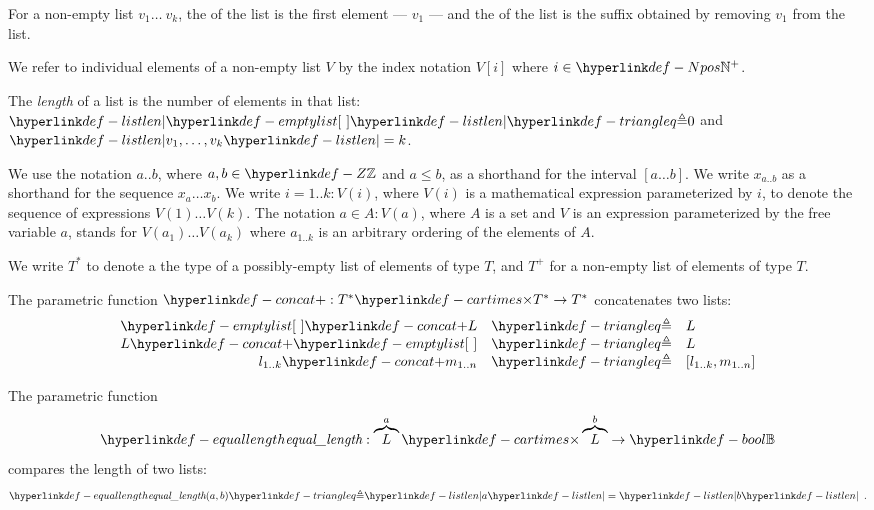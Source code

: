 \hypertarget{def-head}{}
\hypertarget{def-tail}{}
For a non-empty list $v_1 \ldots\ v_k$, the \emph{\head} of the list is the first element --- $v_1$ ---
and the \emph{\tail} of the list is the suffix obtained by removing $v_1$ from the list.

We refer to individual elements of a non-empty list $V$ by the index notation $V[i]$ where $i\in\Npos$.

\hypertarget{def-listlen}{}
\begin{definition}
The \emph{length} of a list is the number of elements in that list:
$\listlen{\emptylist} \triangleq 0$ and $\listlen{v_1,\ldots,v_k}=k$.
\end{definition}

We use the notation $a..b$, where $a,b\in\Z$ and $a\leq b$, as a shorthand for the interval $[a\ldots b]$.
We write $x_{a..b}$ as a shorthand for the sequence $x_a \ldots x_b$.
%
We write $i=1..k: V(i)$, where $V(i)$ is a mathematical expression parameterized by $i$,
to denote the sequence of expressions $V(1) \ldots V(k)$.
The notation $a \in A: V(a)$, where $A$ is a set and $V$ is an expression parameterized by the free variable $a$,
stands for $V(a_1) \ldots V(a_k)$ where $a_{1..k}$ is an arbitrary ordering of the elements of $A$.

We write $T^*$ to denote a the type of a possibly-empty list of elements of type $T$,
and $T^+$ for a non-empty list of elements of type $T$.

\hypertarget{def-concat}{}
\begin{definition}
The parametric function $\concat : T^* \cartimes T^* \rightarrow T^*$ concatenates two lists:
\[
    \begin{array}{rcl}
    \emptylist \concat L &\triangleq& L\\
    L \concat \emptylist &\triangleq& L\\
    l_{1..k} \concat m_{1..n} &\triangleq& [l_{1..k}, m_{1..n}]
    \end{array}
\]
\end{definition}

\hypertarget{def-equallength}{}
\begin{definition}
The parametric function
\[
  \equallength : \overname{L}{a} \cartimes \overname{L}{b} \rightarrow \Bool
\]
compares the length of two lists:
\[
\equallength(a, b) \triangleq \listlen{a}=\listlen{b} \enspace.
\]
\end{definition}

